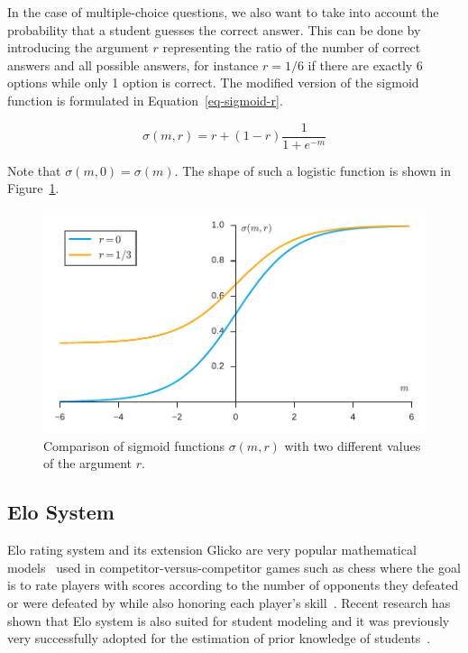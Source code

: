 In the case of multiple-choice questions, we also want to take into account the probability that a student guesses the correct answer. This can be done by introducing the argument $r$ representing the ratio of the number of correct answers and all possible answers, for instance $r = 1/6$ if there are exactly 6 options while only 1 option is correct. The modified version of the sigmoid function is formulated in Equation~\ref{eq-sigmoid-r}.

\begin{equation} \label{eq-sigmoid-r}
  \sigma(m, r) = r + \left(1 - r\right)\frac{1}{1 + e^{-m}}
\end{equation}

Note that $\sigma(m, 0) = \sigma(m)$. The shape of such a logistic function is shown in Figure~\ref{fig:sigmoid-function}.

\begin{figure}[htbp]
  \centering
  \includegraphics[width=\textwidth]{img/sigmoid-function}
  \caption{Comparison of sigmoid functions $\sigma(m, r)$ with two different values of the argument $r$.}
  \label{fig:sigmoid-function}
\end{figure}

\subsection{Elo System}
\label{elo}

Elo rating system and its extension Glicko are very popular mathematical models~\cite{rotou2015ranking} used in competitor-versus-competitor games such as chess where the goal is to rate players with scores according to the number of opponents they defeated or were defeated by while also honoring each player's skill~\cite{Vanek2014}. Recent research has shown that Elo system is also suited for student modeling and it was previously very successfully adopted for the estimation of prior knowledge of students~\cite{Niznan2015}.

